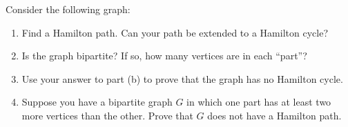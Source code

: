 \documentclass{book}
\begin{document}
\setcounter{project}{18}
\addtocounter{project}{-1}
\begin{activity}[]\label{activity-13}
\hypertarget{p-205}{}%
Consider the following graph:%
\begin{sidebyside}{1}{0.36}{0.36}{0}
\begin{sbspanel}{0.28}
\end{sbspanel}
\end{sidebyside}
\begin{enumerate}[font=\bfseries,label=(\alph*),ref=\alph*]
\item\label{task-16} \hypertarget{p-206}{}%
Find a Hamilton path.  Can your path be extended to a Hamilton cycle?%
\item\label{task-17} \hypertarget{p-208}{}%
Is the graph bipartite? If so, how many vertices are in each ``part''?%
\item\label{task-18} \hypertarget{p-210}{}%
Use your answer to part (b) to prove that the graph has no Hamilton cycle.%
\item\label{task-19} \hypertarget{p-213}{}%
Suppose you have a bipartite graph \(G\) in which one part has at least two more vertices than the other.  Prove that \(G\) does not have a Hamilton path.%
\end{enumerate}
\end{activity}
\end{document}
